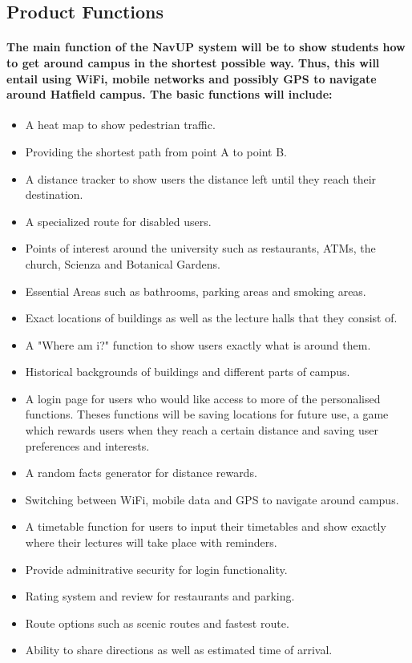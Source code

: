 \documentclass{article}
\begin{document}
		\subsection{Product Functions} \paragraph{The main function of the NavUP system will be to show students how to get around campus in the shortest possible way. Thus, this will entail using WiFi, mobile networks and possibly GPS to navigate around Hatfield campus. The basic functions will include:  }
	\begin{itemize}
  		\item A heat map to show pedestrian traffic.
		\item Providing the shortest path from point A to point B.
 		 \item A distance tracker to show users the distance left until they reach their destination.
		\item A specialized route for disabled users.
		\item Points of interest around the university such as restaurants, ATMs, the church, Scienza and Botanical Gardens.
 		 \item Essential Areas such as bathrooms, parking areas and smoking areas.
		\item Exact locations of buildings as well as the lecture halls that they consist of.
		\item A "Where am i?" function to show users exactly what is around them.
 		 \item Historical backgrounds of buildings and different parts of campus.
		\item A login page for users who would like access to more of the personalised functions. Theses functions will be saving locations for future use, a game which rewards users when they reach a certain distance and saving user preferences and interests.
		\item A random facts generator for distance rewards.
		\item Switching between WiFi, mobile data and GPS to navigate around campus.
		\item A timetable function for users to input their timetables and show exactly where their lectures will take place with reminders.
		\item Provide adminitrative security for login functionality.
		\item Rating system and review for restaurants and parking.
		\item Route options such as scenic routes and fastest route.
		\item Ability to share directions as well as estimated time of arrival.
	\end{itemize}
\end{document}
